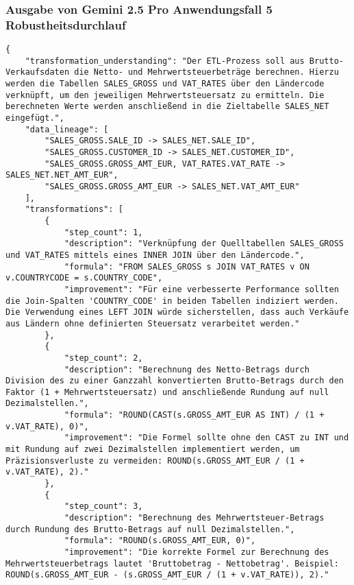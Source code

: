 \subsubsection{Ausgabe von Gemini 2.5 Pro Anwendungsfall 5 Robustheitsdurchlauf}\label{anhang:subsubsec:gemini_case5_prompt3}
\begin{lstlisting}[caption={Ausgabe: Gemini 2.5 Pro Anwendungsfall 5 Robustheitsdurchlauf},label={gemini_case5_prompt3}]
{
    "transformation_understanding": "Der ETL-Prozess soll aus Brutto-Verkaufsdaten die Netto- und Mehrwertsteuerbeträge berechnen. Hierzu werden die Tabellen SALES_GROSS und VAT_RATES über den Ländercode verknüpft, um den jeweiligen Mehrwertsteuersatz zu ermitteln. Die berechneten Werte werden anschließend in die Zieltabelle SALES_NET eingefügt.",
    "data_lineage": [
        "SALES_GROSS.SALE_ID -> SALES_NET.SALE_ID",
        "SALES_GROSS.CUSTOMER_ID -> SALES_NET.CUSTOMER_ID",
        "SALES_GROSS.GROSS_AMT_EUR, VAT_RATES.VAT_RATE -> SALES_NET.NET_AMT_EUR",
        "SALES_GROSS.GROSS_AMT_EUR -> SALES_NET.VAT_AMT_EUR"
    ],
    "transformations": [
        {
            "step_count": 1,
            "description": "Verknüpfung der Quelltabellen SALES_GROSS und VAT_RATES mittels eines INNER JOIN über den Ländercode.",
            "formula": "FROM SALES_GROSS s JOIN VAT_RATES v ON v.COUNTRYCODE = s.COUNTRY_CODE",
            "improvement": "Für eine verbesserte Performance sollten die Join-Spalten 'COUNTRY_CODE' in beiden Tabellen indiziert werden. Die Verwendung eines LEFT JOIN würde sicherstellen, dass auch Verkäufe aus Ländern ohne definierten Steuersatz verarbeitet werden."
        },
        {
            "step_count": 2,
            "description": "Berechnung des Netto-Betrags durch Division des zu einer Ganzzahl konvertierten Brutto-Betrags durch den Faktor (1 + Mehrwertsteuersatz) und anschließende Rundung auf null Dezimalstellen.",
            "formula": "ROUND(CAST(s.GROSS_AMT_EUR AS INT) / (1 + v.VAT_RATE), 0)",
            "improvement": "Die Formel sollte ohne den CAST zu INT und mit Rundung auf zwei Dezimalstellen implementiert werden, um Präzisionsverluste zu vermeiden: ROUND(s.GROSS_AMT_EUR / (1 + v.VAT_RATE), 2)."
        },
        {
            "step_count": 3,
            "description": "Berechnung des Mehrwertsteuer-Betrags durch Rundung des Brutto-Betrags auf null Dezimalstellen.",
            "formula": "ROUND(s.GROSS_AMT_EUR, 0)",
            "improvement": "Die korrekte Formel zur Berechnung des Mehrwertsteuerbetrags lautet 'Bruttobetrag - Nettobetrag'. Beispiel: ROUND(s.GROSS_AMT_EUR - (s.GROSS_AMT_EUR / (1 + v.VAT_RATE)), 2)."

\end{lstlisting}
